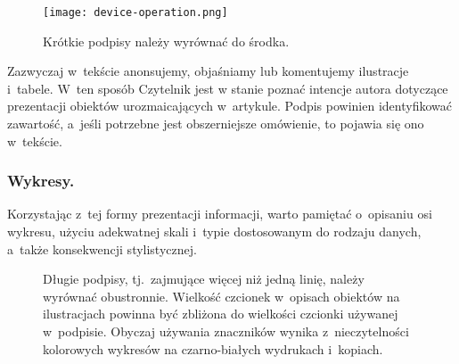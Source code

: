 \begin{figure}
	\begin{center}
		\vspace{-5mm}
		\texttt{[image: device-operation.png]}
		\caption{Krótkie podpisy należy wyrównać do środka.}
		\label{fig:devop}
		\vspace{-8mm}
	\end{center}
\end{figure}

\noindent Zazwyczaj w~tekście anonsujemy, objaśniamy lub komentujemy ilustracje i~tabele. W~ten sposób Czytelnik jest w stanie poznać intencje autora dotyczące prezentacji obiektów urozmaicających w~artykule. Podpis powinien identyfikować zawartość, a~jeśli potrzebne jest obszerniejsze omówienie, to pojawia się ono w~tekście.

\subsubsection{Wykresy.}
\label{subsubsec:charts}

Korzystając z~tej formy prezentacji informacji, warto pamiętać o~opisaniu osi wykresu, użyciu adekwatnej skali i~typie dostosowanym do rodzaju danych, a~także konsekwencji stylistycznej.

\begin{figure}[!h]
	\vspace{-3mm}
	\centering
	\caption{Długie podpisy, tj.~zajmujące więcej niż jedną linię, należy wyrównać obustronnie. Wielkość czcionek w~opisach obiektów na ilustracjach powinna być zbliżona do wielkości czcionki używanej w~podpisie. Obyczaj używania znaczników wynika z~nieczytelności kolorowych wykresów na czarno-białych wydrukach i~kopiach.}
	\vspace{-6mm}
	\label{fig:compressionAlgorithms}
\end{figure}

